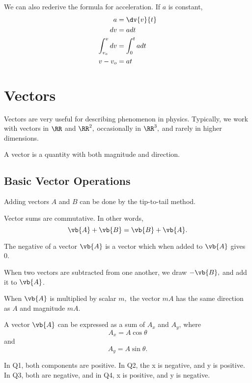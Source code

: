 \documentclass[11pt]{article}
\begin{document}
\noindent We can also rederive the formula for acceleration. If $a$ is constant,
\begin{align*}
	a &= \dv{v}{t} \\
	dv &= adt \\
	\int_{v_o}^v dv &= \int_{0}^t adt \\
	v - v_{o} &= at
\end{align*}

\section{Vectors}
Vectors are very useful for describing phenomenon in physics. Typically, we work with vectors in $\RR$ and $\RR^2,$ occasionally in $\RR^3,$ and rarely in higher dimensions.
\begin{defn}
	A vector is a quantity with both magnitude and direction.
\end{defn}
\subsection{Basic Vector Operations}
Adding vectors $A$ and $B$ can be done by the tip-to-tail method.
\begin{thrm}[Commutativity]
	Vector sums are commutative. In other words,
	\[\vb{A} + \vb{B} = \vb{B} + \vb{A}.\]
\end{thrm}
\begin{defn}[Negative]
	The negative of a vector $\vb{A}$ is a vector which when added to $\vb{A}$ gives 0.
\end{defn}
When two vectors are subtracted from one another, we draw $-\vb{B},$ and add it to $\vb{A}$.
\begin{thrm}
	When $\vb{A}$ is multiplied by scalar $m,$ the vector $mA$ has the same direction as $A$ and magnitude $mA$.
\end{thrm}
\begin{defn}
	A vector $\vb{A}$ can be expressed as a sum of $A_x$ and $A_y$, where
	\[A_x = A\cos\theta\]
	and
	\[A_y = A\sin\theta.\]
\end{defn}
In Q1, both components are positive. In Q2, the x is negative, and y is positive. In Q3, both are negative, and in Q4, x is positive, and y is negative.
\end{document}
